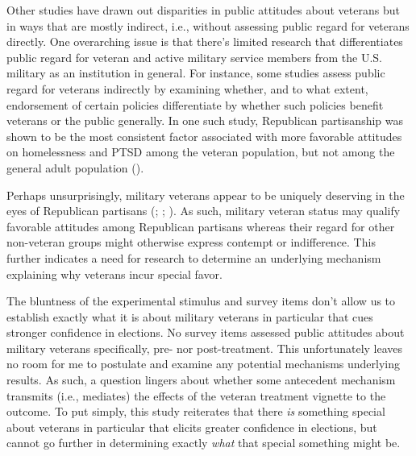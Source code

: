 \documentclass[
  12pt,
  letterpaper,
]{article}
\begin{document}
Other studies have drawn out disparities in public attitudes about
veterans but in ways that are mostly indirect, i.e., without assessing
public regard for veterans directly. One overarching issue is that
there's limited research that differentiates public regard for veteran
and active military service members from the U.S. military as an
institution in general. For instance, some studies assess public regard
for veterans indirectly by examining whether, and to what extent,
endorsement of certain policies differentiate by whether such policies
benefit veterans or the public generally. In one such study, Republican
partisanship was shown to be the most consistent factor associated with
more favorable attitudes on homelessness and PTSD among the veteran
population, but not among the general adult population
().

Perhaps unsurprisingly, military veterans appear to be uniquely
deserving in the eyes of Republican partisans
(;
;
). As such, military veteran
status may qualify favorable attitudes among Republican partisans
whereas their regard for other non-veteran groups might otherwise
express contempt or indifference. This further indicates a need for
research to determine an underlying mechanism explaining why veterans
incur special favor.

The bluntness of the experimental stimulus and survey items don't allow
us to establish exactly what it is about military veterans in particular
that cues stronger confidence in elections. No survey items assessed
public attitudes about military veterans specifically, pre- nor
post-treatment. This unfortunately leaves no room for me to postulate
and examine any potential mechanisms underlying results. As such, a
question lingers about whether some antecedent mechanism transmits
(i.e., mediates) the effects of the veteran treatment vignette to the
outcome. To put simply, this study reiterates that there \emph{is}
something special about veterans in particular that elicits greater
confidence in elections, but cannot go further in determining exactly
\emph{what} that special something might be.
\end{document}
